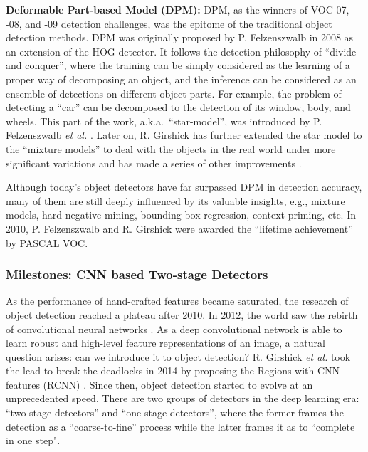 \documentclass[lettersize,journal]{IEEEtran}
\begin{document}
\textbf{Deformable Part-based Model (DPM):}
DPM, as the winners of VOC-07, -08, and -09 detection challenges, was the epitome of the traditional object detection methods. DPM was originally proposed by P. Felzenszwalb \cite{CVPR08-DPM} in 2008 as an extension of the HOG detector.
It follows the detection philosophy of ``divide and conquer'', where the training can be simply considered as the learning of a proper way of decomposing an object, and the inference can be considered as an ensemble of detections on different object parts. For example, the problem of detecting a ``car'' can be decomposed to the detection of its window, body, and wheels. This part of the work, a.k.a.\ ``star-model'', was introduced by P. Felzenszwalb \emph{et al.} \cite{CVPR08-DPM}. Later on, R. Girshick has further extended the star model to the ``mixture models'' to deal with the objects in the real world under more significant variations and has made a series of other improvements \cite{CVPR10-DPM, TPAMI10-DPM, NIPS11-Grammar, PhD-dissert12-DPM}.


Although today's object detectors have far surpassed DPM in detection accuracy, many of them are still deeply influenced by its valuable insights, e.g., mixture models, hard negative mining, bounding box regression, context priming, etc. In 2010, P. Felzenszwalb and R. Girshick were awarded the ``lifetime achievement'' by PASCAL VOC. 

\subsubsection{Milestones: CNN based Two-stage Detectors}

As the performance of hand-crafted features became saturated, the research of object detection reached a plateau after 2010. 
In 2012, the world saw the rebirth of convolutional neural networks \cite{NIPS12-AlexNet}. As a deep convolutional network is able to learn robust and high-level feature representations of an image, a natural question arises: can we introduce it to object detection? R. Girshick \emph{et al.} took the lead to break the deadlocks in 2014 by proposing the Regions with CNN features (RCNN) \cite{CVPR14-RCNN, TPAMI16-RCNN}. Since then, object detection started to evolve at an unprecedented speed. There are two groups of detectors in the deep learning era: ``two-stage detectors'' and ``one-stage detectors'', where the former frames the detection as a ``coarse-to-fine'' process while the latter frames it as to ``complete in one step". 
\end{document}
